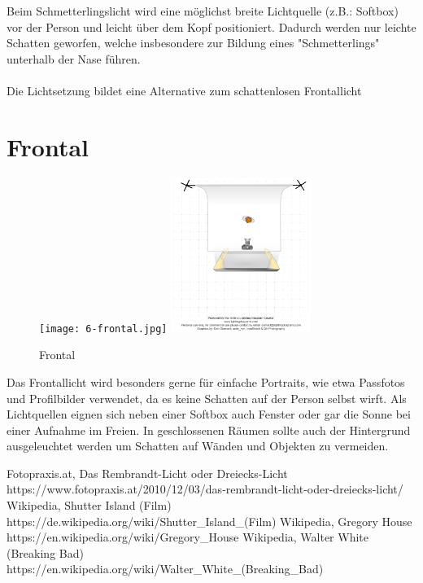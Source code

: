 \documentclass{school}
\begin{document}
Beim Schmetterlingslicht wird eine möglichst breite Lichtquelle (z.B.: Softbox) vor der Person und leicht über dem Kopf positioniert. Dadurch werden nur leichte Schatten geworfen, welche insbesondere zur Bildung eines "Schmetterlings" unterhalb der Nase führen.
\\\\
Die Lichtsetzung bildet eine Alternative zum schattenlosen Frontallicht

\newpage
\section{Frontal}
\begin{figure}[h]
	\centering
	\texttt{[image: 6-frontal.jpg]}
	\includegraphics[height=5cm]{6-frontal-diagram.png}
	\caption{Frontal}
\end{figure}

Das Frontallicht wird besonders gerne für einfache Portraits, wie etwa Passfotos und Profilbilder verwendet, da es keine Schatten auf der Person selbst wirft. Als Lichtquellen eignen sich neben einer Softbox auch Fenster oder gar die Sonne bei einer Aufnahme im Freien. In geschlossenen Räumen sollte auch der Hintergrund ausgeleuchtet werden um Schatten auf Wänden und Objekten zu vermeiden.

\newpage
\listoffigures

\begin{thebibliography}{9}
 Fotopraxis.at, Das Rembrandt-Licht oder Dreiecks-Licht \\ https://www.fotopraxis.at/2010/12/03/das-rembrandt-licht-oder-dreiecks-licht/
 Wikipedia, Shutter Island (Film) \\ https://de.wikipedia.org/wiki/Shutter\_Island\_(Film)
 Wikipedia, Gregory House \\ https://en.wikipedia.org/wiki/Gregory\_House
 Wikipedia, Walter White (Breaking Bad) \\ https://en.wikipedia.org/wiki/Walter\_White\_(Breaking\_Bad)
\end{thebibliography}
\end{document}
